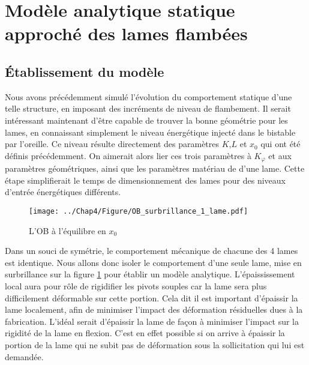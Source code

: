 


	\section{Modèle analytique statique approché des lames flambées} 
		\subsection{Établissement du modèle} 
	Nous avons précédemment simulé l'évolution du comportement statique d'une telle structure, en imposant des incréments de niveau de flambement. Il serait intéressant maintenant d'être capable de trouver la bonne géométrie pour les lames, en connaissant simplement le niveau énergétique injecté dans le bistable par l'oreille. Ce niveau résulte directement des paramètres $K$,$L$ et $x_0$ qui ont été définis précédemment. On aimerait alors lier ces trois paramètres à $K_{\varphi}$ et aux paramètres géométriques, ainsi que les paramètres matériau de d'une lame. Cette étape simplifierait le temps de dimensionnement des lames pour des niveaux d'entrée énergétiques différents.\\
\begin{figure}[!htbp]
\begin{center}
    \captionsetup{justification=centering}
	\texttt{[image: ../Chap4/Figure/OB\_surbrillance\_1\_lame.pdf]}
	\caption{L'OB à l'équilibre en $x_0$}
	\label{fig:OB_surbrillance_1_lame}
\end{center}
\end{figure}
Dans un souci de symétrie, le comportement mécanique de chacune des 4 lames est identique. Nous allons donc isoler le comportement d'une seule lame, mise en surbrillance sur la figure \ref{fig:OB_surbrillance_1_lame} pour établir un modèle analytique.
L'épaississement local aura pour rôle de rigidifier les pivots souples car la lame sera plus difficilement déformable sur cette portion. Cela dit il est important d'épaissir la lame localement, afin de minimiser l'impact des déformation résiduelles dues à la fabrication. L'idéal serait d'épaissir la lame de façon à minimiser l'impact sur la rigidité de la lame en flexion. C'est en effet possible si on arrive à épaissir la portion de la lame qui ne subit pas de déformation sous la sollicitation qui lui est demandée.
